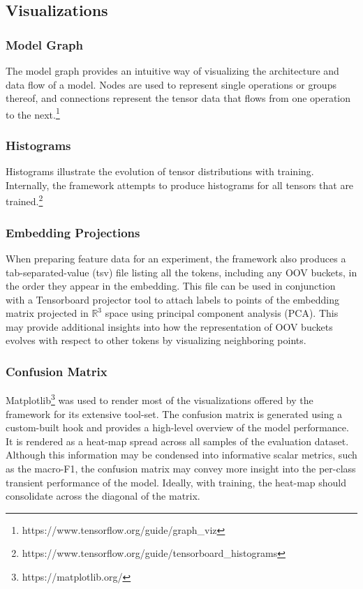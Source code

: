 \documentclass[../../fyp.tex]{subfiles}
\begin{document}
\subsection{Visualizations}

\subsubsection{Model Graph}
The model graph provides an intuitive way of visualizing the architecture and data flow of a model. Nodes are used to represent single operations or groups thereof, and connections represent the tensor data that flows from one operation to the next.\footnote{https://www.tensorflow.org/guide/graph\_viz} 

\subsubsection{Histograms}
Histograms illustrate the evolution of tensor distributions with training. Internally, the framework attempts to produce histograms for all tensors that are trained.\footnote{https://www.tensorflow.org/guide/tensorboard\_histograms}

\subsubsection{Embedding Projections}
When preparing feature data for an experiment, the framework also produces a tab-separated-value (tsv) file listing all the tokens, including any OOV buckets, in the order they appear in the embedding. This file can be used in conjunction with a Tensorboard projector tool to attach labels to points of the embedding matrix projected in $\mathbb{R}^3$ space using principal component analysis (PCA). This may provide additional insights into how the representation of OOV buckets evolves with respect to other tokens by visualizing neighboring points.

\subsubsection{Confusion Matrix}
Matplotlib\footnote{https://matplotlib.org/} was used to render most of the visualizations offered by the framework for its extensive tool-set. The confusion matrix is generated using a custom-built hook and provides a high-level overview of the model performance. It is rendered as a heat-map spread across all samples of the evaluation dataset. Although this information may be condensed into informative scalar metrics, such as the macro-F1, the confusion matrix may convey more insight into the per-class transient performance of the model. Ideally, with training, the heat-map should consolidate across the diagonal of the matrix.
\end{document}
